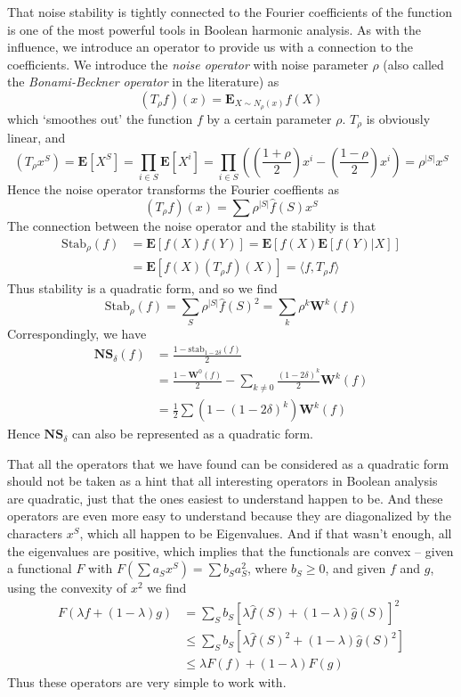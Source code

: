That noise stability is tightly connected to the Fourier coefficients of the function is one of the most powerful tools in Boolean harmonic analysis. As with the influence, we introduce an operator to provide us with a connection to the coefficients. We introduce the \emph{noise operator} with noise parameter $\rho$ (also called the \emph{Bonami-Beckner operator} in the literature) as
%
\[ (T_\rho f)(x) = \mathbf{E}_{X \sim N_\rho(x)} f(X) \]
%
which `smoothes out' the function $f$ by a certain parameter $\rho$. $T_\rho$ is obviously linear, and
%
\[ (T_\rho x^S) = \mathbf{E}[X^S] = \prod_{i \in S} \mathbf{E}[X^i] = \prod_{i \in S} \left( \left( \frac{1 + \rho}{2} \right) x^i - \left( \frac{1 - \rho}{2} \right) x^i \right) = \rho^{|S|} x^S \]
%
Hence the noise operator transforms the Fourier coeffients as
%
\[ (T_\rho f)(x) = \sum \rho^{|S|} \widehat{f}(S) x^S \]
%
The connection between the noise operator and the stability is that
%
\begin{align*}
    \text{Stab}_\rho(f) &= \mathbf{E}[f(X)f(Y)] = \mathbf{E}[f(X)\mathbf{E}[f(Y) | X]]\\
    &= \mathbf{E}[f(X) (T_\rho f)(X)] = \langle f, T_\rho f \rangle
\end{align*}
%
Thus stability is a quadratic form, and so we find
%
\[ \text{Stab}_\rho(f) = \sum_S \rho^{|S|} \widehat{f}(S)^2 = \sum_k \rho^k \mathbf{W}^k(f) \]
%
Correspondingly, we have
%
\begin{align*}
    \mathbf{NS}_\delta(f) &= \frac{1 - \text{stab}_{1 - 2\delta}(f)}{2}\\
    &= \frac{1 - \mathbf{W}^0(f)}{2} - \sum_{k \neq 0} \frac{(1 - 2\delta)^k}{2} \mathbf{W}^k(f)\\
    &= \frac{1}{2} \sum (1 - (1 - 2\delta)^k) \mathbf{W}^k(f)
\end{align*}
%
Hence $\mathbf{NS}_\delta$ can also be represented as a quadratic form.

That all the operators that we have found can be considered as a quadratic form should not be taken as a hint that all interesting operators in Boolean analysis are quadratic, just that the ones easiest to understand happen to be. And these operators are even more easy to understand because they are diagonalized by the characters $x^S$, which all happen to be Eigenvalues. And if that wasn't enough, all the eigenvalues are positive, which implies that the functionals are convex -- given a functional $F$ with $F(\sum a_S x^S) = \sum b_S a_S^2$, where $b_S \geq 0$, and given $f$ and $g$, using the convexity of $x^2$ we find
%
\begin{align*}
    F(\lambda f + (1 - \lambda) g) &= \sum_S b_S \left[ \lambda \widehat{f}(S) + (1 - \lambda) \widehat{g}(S) \right]^2\\
    &\leq \sum_S b_S \left[ \lambda \widehat{f}(S)^2 + (1 - \lambda) \widehat{g}(S)^2 \right]\\
    &\leq \lambda F(f) + (1 - \lambda) F(g)
\end{align*}
%
Thus these operators are very simple to work with.

